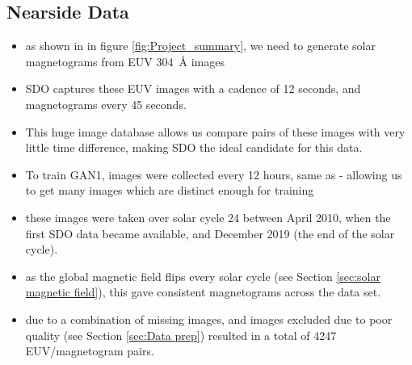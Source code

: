\documentclass[11pt,a4paper,onecolumn]{report}
\begin{document}
\subsection{Nearside Data}
\begin{itemize}
  \item as shown in in figure \ref{fig:Project_summary}, we need to generate solar
        magnetograms from EUV \SI[]{304}[]{\angstrom} images
  \item SDO captures these EUV images with a cadence of 12 seconds, and
        magnetograms every 45 seconds.
  \item This huge image database allows us compare pairs of these images with
        very little time difference, making SDO the ideal candidate for this data.
  \item To train GAN1, images were collected every 12 hours, same as
        \cite{Kim2019} - allowing us to get many images which are distinct enough for
        training
  \item these images were taken over solar cycle 24 between April 2010, when the
        first SDO data became available, and December 2019 (the end of the solar
        cycle).
  \item as the global magnetic field flips every solar cycle (see Section
        \ref{sec:solar magnetic field}), this gave consistent magnetograms across the
        data set.
  \item due to a combination of missing images, and images excluded due to poor
        quality (see Section \ref{sec:Data prep}) resulted in a total of 4247
        EUV/magnetogram pairs.

\end{itemize}
\end{document}
